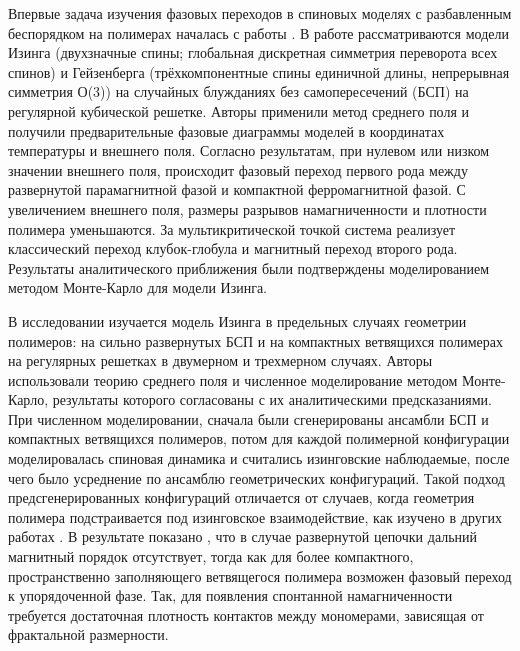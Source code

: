 Впервые задача изучения фазовых переходов в спиновых моделях с разбавленным  беспорядком на полимерах началась с работы \cite{Garel_1999}. 
В работе рассматриваются модели Изинга (двухзначные спины; глобальная дискретная симметрия переворота всех спинов) и Гейзенберга (трёхкомпонентные спины единичной длины, непрерывная симметрия О(3)) на случайных блужданиях без самопересечений (БСП) на регулярной кубической решетке. 
Авторы применили метод среднего поля и получили предварительные фазовые диаграммы моделей в координатах температуры и внешнего поля. 
Согласно результатам,  при нулевом или низком значении внешнего поля, происходит фазовый переход первого рода между развернутой парамагнитной фазой и компактной ферромагнитной фазой. 
С увеличением внешнего поля, размеры разрывов намагниченности и плотности полимера уменьшаются. 
За мультикритической точкой система реализует классический переход клубок-глобула и магнитный переход второго рода.  
Результаты аналитического приближения были подтверждены  моделированием методом Монте-Карло для модели Изинга. 




В исследовании  \cite{papalerosa} изучается модель Изинга  в предельных случаях  геометрии полимеров: на сильно развернутых БСП и на компактных ветвящихся полимерах на регулярных решетках в двумерном и трехмерном случаях. 
Авторы использовали теорию среднего поля и численное моделирование методом Монте-Карло, результаты которого согласованы с их аналитическими предсказаниями. 
При численном моделировании, сначала были сгенерированы ансамбли БСП и компактных  ветвящихся полимеров, потом для каждой полимерной конфигурации моделировалась спиновая динамика и считались изинговские наблюдаемые, после чего было усреднение по ансамблю геометрических конфигураций. 
Такой подход предсгенерированных конфигураций отличается от случаев, когда геометрия полимера подстраивается под изинговское взаимодействие, как изучено в других работах  \cite{Garel_1999,PhysRevE.104.024122,faizullina2021critical1}. 
В результате показано  \cite{papalerosa}, что в случае развернутой цепочки  дальний магнитный порядок отсутствует, тогда как для более компактного, пространственно заполняющего ветвящегося полимера возможен фазовый переход к упорядоченной фазе.
Так, для появления спонтанной намагниченности требуется достаточная плотность контактов между мономерами, зависящая от фрактальной размерности.





